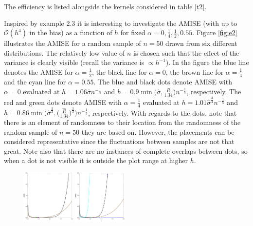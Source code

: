 \documentclass[
twoside,
openright,
titlepage,
numbers=noenddot,
headinclude,%
footinclude=true,
dottedtoc, %
ngerman,
american, %
pagesize=pdftex,
]{book}
\begin{document}
	The efficiency is listed alongside the kernels considered in table \ref{t2}.
	\begin{example}
		\noindent Inspired by example 2.3 it is interesting to investigate the AMISE (with up to $\mathcal{O}(h^4)$ in the bias) as a function of $h$ for fixed $\alpha=0,\frac{1}{4},\frac{1}{2},0.55$. Figure \ref{fig:e2} illustrates the AMISE for a random sample of $n=50$ drawn from six different distributions. The relatively low value of $n$ is chosen such that the effect of the variance is clearly visible (recall the variance is $\propto h^{-1}$).\newline 
		In the figure the blue line denotes the AMISE for $\alpha=\frac{1}{2}$, the black line for $\alpha=0$, the brown line for $\alpha=\frac{1}{4}$ and the cyan line for $\alpha=0.55$. The blue and black dots denote AMISE with $\alpha=0$ evaluated at $h=1.06\hat{\sigma}n^{-\frac{1}{5}}$ and $h=0.9\min\big(\hat{\sigma},\frac{\hat{R}}{1.34}\big)n^{-\frac{1}{5}}$, respectively. The red and green dots denote AMISE with $\alpha=\frac{1}{4}$ evaluated at $h=1.01\hat{\sigma}^{\frac{3}{4}}n^{-\frac{1}{5}}$ and $h=0.86\min\big(\hat{\sigma}^{\frac{3}{4}},\big(\frac{\hat{R}}{1.34}\big)^\frac{3}{4}\big)n^{-\frac{1}{5}}$, respectively. With regards to the dots, note that there is an element of randomness to their location from the randomness of the random sample of $n=50$ they are based on. However, the placements can be considered representative since the fluctuations between samples are not that great. Note also that there are no instances of complete overlaps between dots, so when a dot is not visible it is outside the plot range at higher $h$. 
		\begin{figure}[H]
			\centering
			\captionsetup{width=0.95\textwidth}
			\includegraphics[width=0.24\textwidth]{figures/AMISEExample/normal}
			\includegraphics[width=0.24\textwidth]{figures/AMISEExample/studentT}\\

\end{figure}
\end{example}
\end{document}
